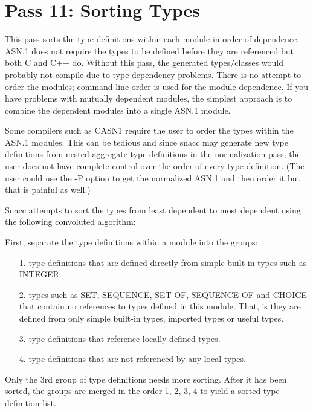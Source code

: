 \section{\label{comp-pass11-section}Pass 11: Sorting Types}

This pass sorts the type definitions within each module in order of
dependence.  ASN.1 does not require the types to be defined before
they are referenced but both C and C++ do.  Without this pass, the
generated types/classes would probably not compile due to type
dependency problems.  There is no attempt to order the modules;
command line order is used for the module dependence.  If you have
problems with mutually dependent modules, the simplest approach is to
combine the dependent modules into a single ASN.1 module.

Some compilers such as CASN1 \cite{CASN1} require the user to order
the types within the ASN.1 modules.  This can be tedious and since
snacc may generate new type definitions from nested aggregate type
definitions in the normalization pass, the user does not have complete
control over the order of every type definition.  (The user could use
the {\ufn -P} option to get the normalized ASN.1 and then order it but
that is painful as well.)

Snacc attempts to sort the types from least dependent to most
dependent using the following convoluted algorithm:

First, separate the type definitions within a module into the groups:
\begin{itemize}
\item[1.] { type definitions that are defined directly from simple built-in
types such as INTEGER.}

\item[2.] { types such as SET, SEQUENCE, SET OF, SEQUENCE OF and CHOICE
that contain no references to types defined in this module.  That, is
they are defined from only simple built-in types, imported types or
useful types.}

\item[3.] { type definitions that reference locally defined types.}

\item[4.] { type definitions that are not referenced by any local types.}
\end{itemize}

Only the 3rd group of type definitions needs more sorting.  After it
has been sorted, the groups are merged in the order 1, 2, 3, 4 to
yield a sorted type definition list.

